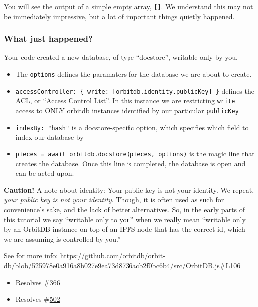 You will see the output of a simple empty array, \texttt{{[}{]}}. We
understand this may not be immediately impressive, but a lot of
important things quietly happened.

\subsubsection{What just happened?}\label{what-just-happened-1}

Your code created a new database, of type ``docstore'', writable only by
you.

\begin{itemize}
\tightlist
\item
  The \texttt{options} defines the paramaters for the database we are
  about to create.
\item
  \texttt{accessController:\ \{\ write:\ {[}orbitdb.identity.publicKey{]}\ \}}
  defines the ACL, or ``Access Control List''. In this instance we are
  restricting \texttt{write} access to ONLY orbitdb instances identified
  by our particular \texttt{publicKey}
\item
  \texttt{indexBy:\ "hash"} is a docstore-specific option, which
  specifies which field to index our database by
\item
  \texttt{pieces\ =\ await\ orbitdb.docstore(\textquotesingle{}pieces\textquotesingle{},\ options)}
  is the magic line that creates the database. Once this line is
  completed, the database is open and can be acted upon.
\end{itemize}

\textbf{Caution!} A note about identity: Your public key is not your
identity. We repeat, \emph{your public key is not your identity}.
Though, it is often used as such for convenience's sake, and the lack of
better alternatives. So, in the early parts of this tutorial we say
``writable only to you'' when we really mean ``writable only by an
OrbitDB instance on top of an IPFS node that has the correct id, which
we are assuming is controlled by you.''

See for more info:
https://github.com/orbitdb/orbit-db/blob/525978e0a916a8b027e9ea73d8736acb2f0bc6b4/src/OrbitDB.js\#L106

\begin{itemize}
\tightlist
\item
  Resolves \#\href{https://github.com/orbitdb/orbit-db/issues/366}{366}
\item
  Resolves \#\href{https://github.com/orbitdb/orbit-db/issues/502}{502}
\end{itemize}

